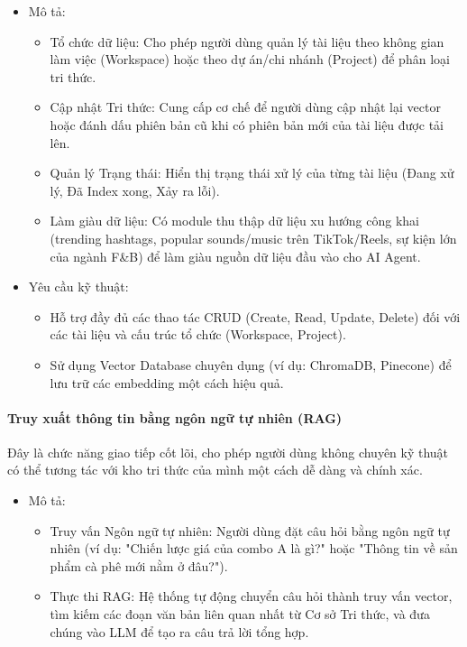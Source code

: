 \begin{itemize}
\item
  Mô tả:

  \begin{itemize}
  \item
    Tổ chức dữ liệu: Cho phép người dùng quản lý tài liệu theo không
    gian làm việc (Workspace) hoặc theo dự án/chi nhánh (Project) để
    phân loại tri thức.
  \item
    Cập nhật Tri thức: Cung cấp cơ chế để người dùng cập nhật lại vector
    hoặc đánh dấu phiên bản cũ khi có phiên bản mới của tài liệu được
    tải lên.
  \item
    Quản lý Trạng thái: Hiển thị trạng thái xử lý của từng tài liệu
    (Đang xử lý, Đã Index xong, Xảy ra lỗi).
  \item
    Làm giàu dữ liệu: Có module thu thập dữ liệu xu hướng công khai
    (trending hashtags, popular sounds/music trên TikTok/Reels, sự kiện
    lớn của ngành F\&B) để làm giàu nguồn dữ liệu đầu vào cho AI Agent.
  \end{itemize}
\item
  Yêu cầu kỹ thuật:

  \begin{itemize}
  \item
    Hỗ trợ đầy đủ các thao tác CRUD (Create, Read, Update, Delete) đối
    với các tài liệu và cấu trúc tổ chức (Workspace, Project).
  \item
    Sử dụng Vector Database chuyên dụng (ví dụ: ChromaDB, Pinecone) để
    lưu trữ các embedding một cách hiệu quả.
  \end{itemize}
\end{itemize}

\paragraph{Truy xuất thông tin bằng ngôn ngữ tự nhiên
(RAG)}\label{truy-xuux1ea5t-thuxf4ng-tin-bux1eb1ng-nguxf4n-ngux1eef-tux1ef1-nhiuxean-rag}

Đây là chức năng giao tiếp cốt lõi, cho phép người dùng không chuyên kỹ
thuật có thể tương tác với kho tri thức của mình một cách dễ dàng và
chính xác.

\begin{itemize}
\item
  Mô tả:

  \begin{itemize}
  \item
    Truy vấn Ngôn ngữ tự nhiên: Người dùng đặt câu hỏi bằng ngôn ngữ tự
    nhiên (ví dụ: "Chiến lược giá của combo A là gì?" hoặc "Thông tin về
    sản phẩm cà phê mới nằm ở đâu?").
  \item
    Thực thi RAG: Hệ thống tự động chuyển câu hỏi thành truy vấn vector,
    tìm kiếm các đoạn văn bản liên quan nhất từ Cơ sở Tri thức, và đưa
    chúng vào LLM để tạo ra câu trả lời tổng hợp.
  \end{itemize}
\end{itemize}

